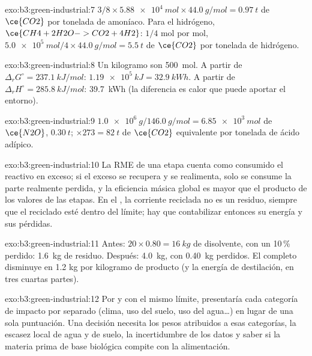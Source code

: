 \begin{solution}{exo:b3:green-industrial:7}
$3/8 \times \qty{5.88e4}{mol} \times \qty{44.0}{g/mol} = \qty{0.97}{t}$ de $\ce{CO2}$ por tonelada de amoníaco. Para el hidrógeno, $\ce{CH4 + 2H2O -> CO2 + 4H2}$:
$1/4$ mol por mol, $\qty{5.0e5}{mol}/4 \times \qty{44.0}{g/mol} = \qty{5.5}{t}$ de $\ce{CO2}$ por tonelada de hidrógeno.
\end{solution}

\begin{solution}{exo:b3:green-industrial:8}
Un kilogramo son \qty{500}{mol}. A partir de $\Delta_rG^\circ = \qty{237.1}{kJ/mol}$: $\qty{1.19e5}{kJ} = \qty{32.9}{kWh}$. A partir de $\Delta_rH^\circ = \qty{285.8}{kJ/mol}$: \qty{39.7}{kWh}
(la diferencia es calor que puede aportar el entorno).
\end{solution}

\begin{solution}{exo:b3:green-industrial:9}
$\qty{1.0e6}{g}/\qty{146.0}{g/mol} = \qty{6.85e3}{mol}$ de $\ce{N2O}$, $\qty{0.30}{t}$; $\times 273 = \qty{82}{t}$ de $\ce{CO2}$ equivalente por tonelada de ácido adípico.
\end{solution}

\begin{solution}{exo:b3:green-industrial:10}
La RME de una etapa cuenta como consumido el reactivo en exceso; si el exceso se recupera
y se realimenta, solo se consume la parte realmente perdida, y la eficiencia másica global
es mayor que el producto de los valores de las etapas. En el , la
corriente reciclada no es un residuo, siempre que el reciclado esté dentro del límite;
hay que contabilizar entonces su energía y sus pérdidas.
\end{solution}

\begin{solution}{exo:b3:green-industrial:11}
Antes: $20 \times 0.80 = \qty{16}{kg}$ de disolvente, con un 10\,\% perdido: \qty{1.6}{kg} de residuo. Después: \qty{4.0}{kg}, con \qty{0.40}{kg} perdidos. El
 completo disminuye en 1.2 kg por kilogramo de producto (y la energía de destilación,
en tres cuartas partes).
\end{solution}

\begin{solution}{exo:b3:green-industrial:12}
Por  y con el mismo límite, presentaría cada categoría de impacto
por separado (clima, uso del suelo, uso del agua\dots) en lugar de una sola puntuación. Una
decisión necesita los pesos atribuidos a esas categorías, la escasez local de agua
y de suelo, la incertidumbre de los datos y saber si la materia prima de base biológica
compite con la alimentación.
\end{solution}

